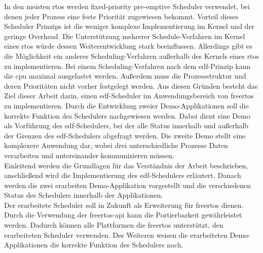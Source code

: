 \documentclass[../EDF Master Thesis.tex]{subfiles}
\begin{document}
    In den meisten \ac{rtos} werden fixed-priority pre-emptive Scheduler verwendet, bei denen jeder Prozess eine feste Priorität zugewiesen bekommt.
    Vorteil dieses Scheduler Prinzips ist die weniger komplexe Implementierung im Kernel und der geringe Overhead.
    Die Unterstützung mehrerer Schedule-Verfahren im Kernel eines \ac{rtos} würde dessen Weiterentwicklung stark beeinflussen.
    Allerdings gibt es die Möglichkeit ein anderes Scheduling-Verfahren außerhalb des Kernels eines \ac{rtos} zu implementieren.
    Bei einem Scheduling-Verfahren nach dem \ac{edf}-Prinzip kann die \ac{cpu} maximal ausgelastet werden.
    Außerdem muss die Prozessstruktur und deren Prioritäten nicht vorher festgelegt werden.
    Aus diesen Gründen besteht das Ziel dieser Arbeit darin, einen \ac{edf}-Scheduler im Anwendungsbereich von \ac{freertos} zu implementieren.
    Durch die Entwicklung zweier Demo-Applikationen soll die korrekte Funktion des Schedulers nachgewiesen werden.
    Dabei dient eine Demo als Vorführung des \ac{edf}-Schedulers, bei der alle Status innerhalb und außerhalb der Grenzen des \ac{edf}-Schedulers abgefragt werden.
    Die zweite Demo stellt eine komplexere Anwendung dar, wobei drei unterschiedliche Prozesse Daten verarbeiten und untereinander kommunizieren müssen.\\
    Einleitend werden die Grundlagen für das Verständnis der Arbeit beschrieben, anschließend wird die Implementierung des \ac{edf}-Schedulers erläutert.
    Danach werden die zwei erarbeiten Demo-Applikation vorgestellt und die verschiedenen Status des Schedulers innerhalb der Applikationen.\\
    Der erarbeitete Scheduler soll in Zukunft als Erweiterung für \ac{freertos} dienen.
    Durch die Verwendung der \ac{freertos}-\ac{api} kann die Portierbarkeit gewährleistet werden.
    Dadurch können alle Plattformen die \ac{freertos} unterstützt, den erarbeiteten Scheduler verwenden.
    Des Weiteren weisen die erarbeiteten Demo-Applikationen die korrekte Funktion des Schedulers nach.
\end{document}
